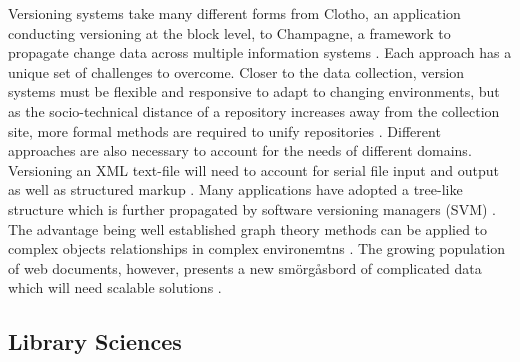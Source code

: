 Versioning systems take many different forms from Clotho, an application conducting versioning at the block level, to Champagne, a framework to propagate change data across multiple information systems \cite{Flouris04clotho:transparent} \cite{Systems02champagne:data}.
Each approach has a unique set of challenges to overcome.
Closer to the data collection, version systems must be flexible and responsive to adapt to changing environments, but as the socio-technical distance of a repository increases away from the collection site, more formal methods are required to unify repositories \cite{Baker2009}.
Different approaches are also necessary to account for the needs of different domains.
Versioning an XML text-file will need to account for serial file input and output as well as structured markup \cite{Chien:2000:VMX:646544.696357}.
Many applications have adopted a tree-like structure which is further propagated by software versioning managers (SVM) \cite{Stuckenholz:2005:CEV:1039174.1039197}.
The advantage being well established graph theory methods can be applied to complex objects relationships in complex environemtns \cite{Dijkstra1994}.
The growing population of web documents, however, presents a new smörgåsbord of complicated data which will need scalable solutions \cite{Berberich:2007:TMT:1277741.1277831}.

\subsection{Library Sciences}

